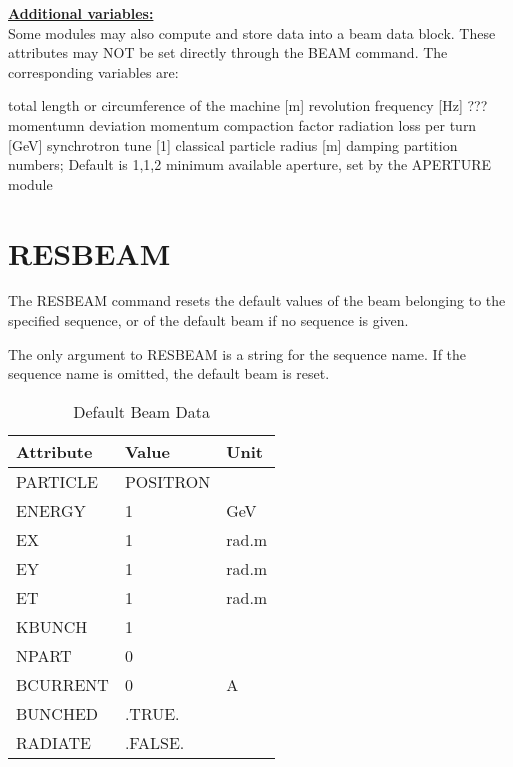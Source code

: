 {\bf \underline{Additional variables:}}\\ 
Some \mad modules may also compute and store data into a beam data 
block. These attributes may NOT be set directly through the BEAM
command. The corresponding variables are:  
\begin{madlist}
   total length or circumference of the machine [m]
   revolution frequency [Hz]
   ???
   momentumn deviation
   momentum compaction factor
   radiation loss per turn [GeV]
   synchrotron tune [1]
   classical particle radius [m]
   damping partition numbers; Default is {1,1,2}
   minimum available aperture, set by the APERTURE module
\end{madlist}

\section{RESBEAM}
\label{sec:resbeam}

The RESBEAM command resets the default values of the beam belonging to
the specified sequence, or of the default beam if no sequence is given.  


The only argument to RESBEAM is a string for the sequence name.
If the sequence name is omitted, the default beam is reset. 

\begin{table}[h]
  \caption{Default Beam Data}
  \begin{center}
     \begin{tabular}{|l|l|l|}
       \hline
       Attribute     &  Value    & Unit  \\
       \hline
       PARTICLE      &  POSITRON & \\
       ENERGY        &  1        & GeV \\
       EX            &  1        & rad.m \\
       EY            &  1        & rad.m \\
       ET            &  1        & rad.m \\
       KBUNCH        &  1        & \\
       NPART         &  0        & \\
       BCURRENT      &  0        & A \\
       BUNCHED       &  .TRUE.   & \\
       RADIATE       &  .FALSE.  & \\     
       \hline
     \end{tabular}
  \end{center}
\end{table}


